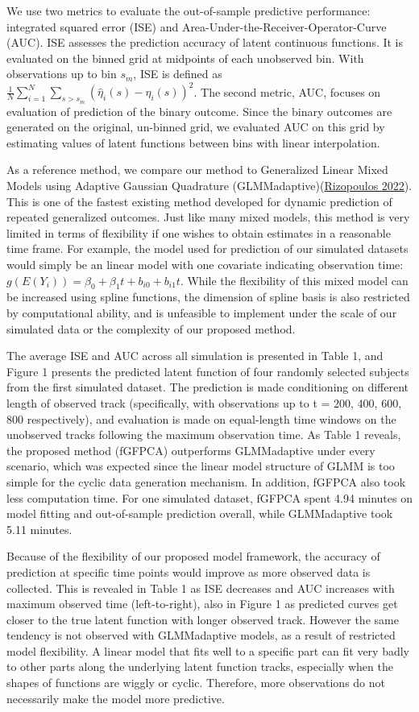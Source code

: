 \documentclass[
  11pt,
]{article}
\begin{document}
We use two metrics to evaluate the out-of-sample predictive performance:
integrated squared error (ISE) and
Area-Under-the-Receiver-Operator-Curve (AUC). ISE assesses the
prediction accuracy of latent continuous functions. It is evaluated on
the binned grid at midpoints of each unobserved bin. With observations
up to bin \(s_m\), ISE is defined as
\(\frac{1}{N}\sum_{i=1}^N\sum_{s>s_m} (\hat{\eta}_i(s)-\eta_i(s))^2\).
The second metric, AUC, focuses on evaluation of prediction of the
binary outcome. Since the binary outcomes are generated on the original,
un-binned grid, we evaluated AUC on this grid by estimating values of
latent functions between bins with linear interpolation.

As a reference method, we compare our method to Generalized Linear Mixed
Models using Adaptive Gaussian Quadrature
(GLMMadaptive)(\protect\hyperlink{ref-GLMMadaptive}{Rizopoulos 2022}).
This is one of the fastest existing method developed for dynamic
prediction of repeated generalized outcomes. Just like many mixed
models, this method is very limited in terms of flexibility if one
wishes to obtain estimates in a reasonable time frame. For example, the
model used for prediction of our simulated datasets would simply be an
linear model with one covariate indicating observation time:
\(g(E(Y_i)) = \beta_0+\beta_1t+b_{i0}+b_{i1}t\). While the flexibility
of this mixed model can be increased using spline functions, the
dimension of spline basis is also restricted by computational ability,
and is unfeasible to implement under the scale of our simulated data or
the complexity of our proposed method.

The average ISE and AUC across all simulation is presented in Table 1,
and Figure 1 presents the predicted latent function of four randomly
selected subjects from the first simulated dataset. The prediction is
made conditioning on different length of observed track (specifically,
with observations up to t = 200, 400, 600, 800 respectively), and
evaluation is made on equal-length time windows on the unobserved tracks
following the maximum observation time. As Table 1 reveals, the proposed
method (fGFPCA) outperforms GLMMadaptive under every scenario, which was
expected since the linear model structure of GLMM is too simple for the
cyclic data generation mechanism. In addition, fGFPCA also took less
computation time. For one simulated dataset, fGFPCA spent 4.94 minutes
on model fitting and out-of-sample prediction overall, while
GLMMadaptive took 5.11 minutes.

Because of the flexibility of our proposed model framework, the accuracy
of prediction at specific time points would improve as more observed
data is collected. This is revealed in Table 1 as ISE decreases and AUC
increases with maximum observed time (left-to-right), also in Figure 1
as predicted curves get closer to the true latent function with longer
observed track. However the same tendency is not observed with
GLMMadaptive models, as a result of restricted model flexibility. A
linear model that fits well to a specific part can fit very badly to
other parts along the underlying latent function tracks, especially when
the shapes of functions are wiggly or cyclic. Therefore, more
observations do not necessarily make the model more predictive.
\end{document}
